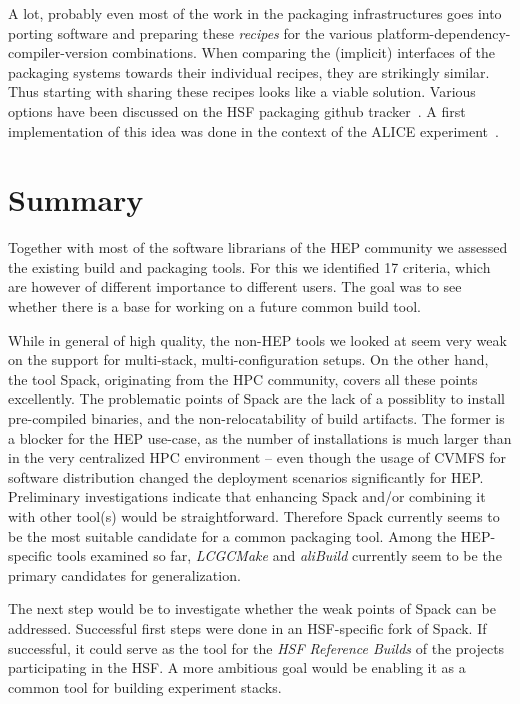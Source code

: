 \documentclass[12pt,a4paper]{article}
\begin{document}
A lot, probably even most of the work in the packaging infrastructures goes into porting software and preparing these \emph{recipes} for the various platform-dependency-compiler-version combinations. When comparing the (implicit) interfaces of the packaging systems towards their individual recipes, they are strikingly similar. Thus starting with sharing these recipes looks like a viable solution. Various options have been discussed on the HSF packaging github tracker~\cite{github:discussion}. A first implementation of this idea was done in the context of the ALICE experiment~\cite{alidist}.

\section{Summary}
Together with most of the software librarians of the HEP community we assessed the existing build and packaging tools. For this we identified 17 criteria, which are however of different importance to different users. The goal was to see whether there is a base for working on a future common build tool.

While in general of high quality, the non-HEP tools we looked at seem very weak on the support for multi-stack, multi-configuration setups. On the other hand, the tool Spack, originating from the HPC community, covers all these points excellently. The problematic points of Spack are the lack of a possiblity to install pre-compiled binaries, and the non-relocatability of build artifacts. The former is a blocker for the HEP use-case, as the number of installations is much larger than in the very centralized HPC environment -- even though the usage of CVMFS for software distribution changed the deployment scenarios significantly for HEP. Preliminary investigations indicate that enhancing Spack and/or combining it with other tool(s) would be straightforward. Therefore Spack currently seems to be the most suitable candidate for a common packaging tool. Among the HEP-specific tools examined so far, \emph{LCGCMake} and \emph{aliBuild} currently seem to be the primary candidates for generalization.

The next step would be to investigate whether the weak points of Spack can be addressed. Successful first steps were done in an HSF-specific fork of Spack. If successful, it could serve as the tool for the \emph{HSF Reference Builds} of the projects participating in the HSF. A more ambitious goal would be enabling it as a common tool for building experiment stacks.
\end{document}
